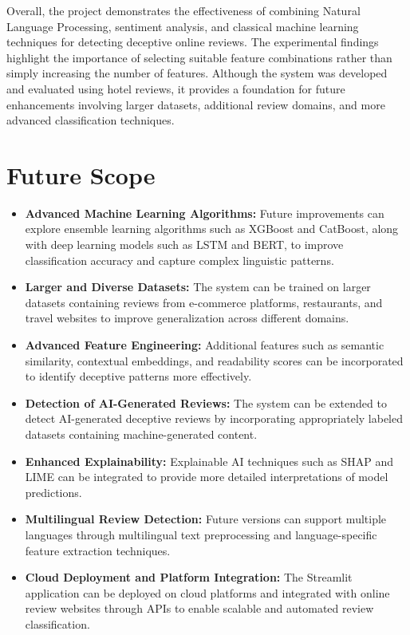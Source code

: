 \documentclass[12pt,a4paper]{report}
\begin{document}
Overall, the project demonstrates the effectiveness of
combining Natural Language Processing, sentiment analysis,
and classical machine learning techniques for detecting
deceptive online reviews. The experimental findings highlight
the importance of selecting suitable feature combinations
rather than simply increasing the number of features.
Although the system was developed and evaluated using
hotel reviews, it provides a foundation for future
enhancements involving larger datasets, additional review
domains, and more advanced classification techniques.

\newpage

\chapter{Future Scope}

\begin{itemize}

    \item \textbf{Advanced Machine Learning Algorithms:}
    Future improvements can explore ensemble learning
    algorithms such as XGBoost and CatBoost, along with
    deep learning models such as LSTM and BERT, to improve
    classification accuracy and capture complex
    linguistic patterns.

    \item \textbf{Larger and Diverse Datasets:}
    The system can be trained on larger datasets containing
    reviews from e-commerce platforms, restaurants, and
    travel websites to improve generalization across
    different domains.

    \item \textbf{Advanced Feature Engineering:}
    Additional features such as semantic similarity,
    contextual embeddings, and readability scores can
    be incorporated to identify deceptive patterns
    more effectively.

    \item \textbf{Detection of AI-Generated Reviews:}
    The system can be extended to detect AI-generated
    deceptive reviews by incorporating appropriately
    labeled datasets containing machine-generated content.

    \item \textbf{Enhanced Explainability:}
    Explainable AI techniques such as SHAP and LIME
    can be integrated to provide more detailed
    interpretations of model predictions.

    \item \textbf{Multilingual Review Detection:}
    Future versions can support multiple languages
    through multilingual text preprocessing and
    language-specific feature extraction techniques.

    \item \textbf{Cloud Deployment and Platform Integration:}
    The Streamlit application can be deployed on cloud
    platforms and integrated with online review websites
    through APIs to enable scalable and automated
    review classification.

\end{itemize}
\end{document}
